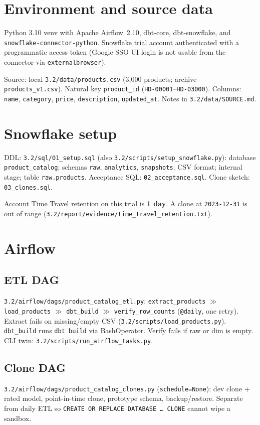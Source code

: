 \documentclass[conference]{IEEEtran}
\begin{document}
\section{Environment and source data}
Python 3.10 venv with Apache Airflow~2.10, dbt-core, dbt-snowflake, and
\texttt{snowflake-connector-python}. Snowflake trial account authenticated
with a programmatic access token (Google SSO UI login is not usable from
the connector via \texttt{externalbrowser}).

Source: local \texttt{3.2/data/products.csv} (3{,}000 products; archive
\texttt{products\_v1.csv}). Natural key \texttt{product\_id}
(\texttt{HD-00001}--\texttt{HD-03000}). Columns:
\texttt{name}, \texttt{category}, \texttt{price}, \texttt{description},
\texttt{updated\_at}. Notes in \texttt{3.2/data/SOURCE.md}.

\section{Snowflake setup}
DDL: \texttt{3.2/sql/01\_setup.sql} (also
\texttt{3.2/scripts/setup\_snowflake.py}):
database \texttt{product\_catalog}; schemas \texttt{raw},
\texttt{analytics}, \texttt{snapshots}; CSV format; internal stage;
table \texttt{raw.products}.
Acceptance SQL: \texttt{02\_acceptance.sql}. Clone sketch:
\texttt{03\_clones.sql}.

Account Time Travel retention on this trial is \textbf{1 day}. A clone at
\texttt{2023-12-31} is out of range
(\texttt{3.2/report/evidence/time\_travel\_retention.txt}).

\section{Airflow}
\subsection{ETL DAG}
\texttt{3.2/airflow/dags/product\_catalog\_etl.py}:
\texttt{extract\_products} $\gg$ \texttt{load\_products} $\gg$
\texttt{dbt\_build} $\gg$ \texttt{verify\_row\_counts}
(\texttt{@daily}, one retry).
Extract fails on missing/empty CSV
(\texttt{3.2/scripts/load\_products.py}).
\texttt{dbt\_build} runs \texttt{dbt build} via BashOperator.
Verify fails if raw or dim is empty.
CLI twin: \texttt{3.2/scripts/run\_airflow\_tasks.py}.

\subsection{Clone DAG}
\texttt{3.2/airflow/dags/product\_catalog\_clones.py}
(\texttt{schedule=None}):
dev clone + rated model, point-in-time clone, prototype schema,
backup/restore. Separate from daily ETL so
\texttt{CREATE OR REPLACE DATABASE \ldots\ CLONE} cannot wipe a sandbox.
\end{document}
